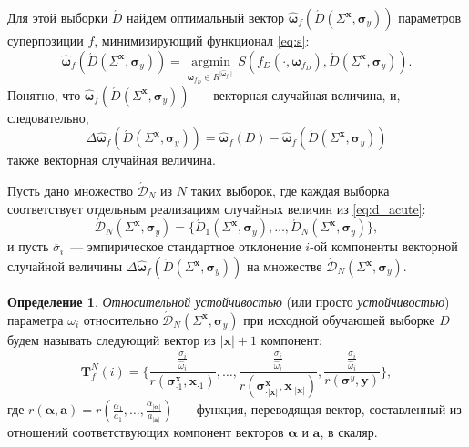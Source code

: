 \documentclass[11pt,a4paper]{article}
\theoremstyle{definition}
\newtheorem{defin}{Определение}
\begin{document}
Для этой выборки $\acute{D}$ найдем оптимальный вектор $\hat{\boldsymbol{\omega}}_f (\acute{D} (\Sigma^{\mathbf{x}}, \boldsymbol{\sigma}_y))$
параметров суперпозиции $f$, минимизирующий функционал \eqref{eq:s}:
\begin{equation}
  \hat{\boldsymbol{\omega}}_f (\acute{D} (\Sigma^{\mathbf{x}}, \boldsymbol{\sigma}_y)) = \mathop{\arg \min}\limits_{\boldsymbol{\omega}_{f_D} \in R^{\mid \hat{\boldsymbol{\omega}}_f \mid}} S (f_D (\cdot, \boldsymbol{\omega}_{f_D}), \acute{D} (\Sigma^{\mathbf{x}}, \boldsymbol{\sigma}_y)).
  \label{eq:hat_omega}
\end{equation}
Понятно, что $\hat{\boldsymbol{\omega}}_f (\acute{D} (\Sigma^{\mathbf{x}}, \boldsymbol{\sigma}_y))$~---
векторная случайная величина, и, следовательно,
\[
  \Delta\hat{\boldsymbol{\omega}}_f(\acute{D} (\Sigma^{\mathbf{x}}, \boldsymbol{\sigma}_y) ) = \hat{\boldsymbol{\omega}}_f(D) - \hat{\boldsymbol{\omega}}_f (\acute{D} (\Sigma^{\mathbf{x}}, \boldsymbol{\sigma}_y))
\]
также векторная случайная величина.

Пусть дано множество $\acute{\mathcal{D}}_N$ из $N$ таких выборок, где каждая выборка
соответствует отдельным реализациям случайных величин из \eqref{eq:d_acute}:
\[
  \acute{\mathcal{D}}_N (\Sigma^{\mathbf{x}}, \boldsymbol{\sigma}_y) = \{ \acute{D}_1 (\Sigma^{\mathbf{x}}, \boldsymbol{\sigma}_y), \dots, \acute{D}_N (\Sigma^{\mathbf{x}}, \boldsymbol{\sigma}_y) \},
\]
и пусть $\overline{\sigma}_i$~--- эмпирическое стандартное отклонение $i$-ой компоненты
векторной случайной величины
$\Delta\hat{\boldsymbol{\omega}}_f(\acute{D} (\Sigma^{\mathbf{x}}, \boldsymbol{\sigma}_y) )$
на множестве $\acute{\mathcal{D}}_N (\Sigma^{\mathbf{x}}, \boldsymbol{\sigma}_y)$.
\begin{defin}
\emph{Относительной устойчивостью} (или просто \emph{устойчивостью}) параметра
$\omega_i$ относительно $\acute{\mathcal{D}}_N (\Sigma^{\mathbf{x}}, \boldsymbol{\sigma}_y)$
при исходной обучающей выборке $D$ будем называть следующий вектор
из $| \mathbf{x} | + 1$ компонент:
\begin{equation}
  \mathbf{T}^N_f(i) = \Big\{ \frac{\frac{\overline{\sigma}_i}{\hat{\omega}_i}}{r(\boldsymbol{\sigma}^\mathbf{x}_{\cdot 1}, \mathbf{x}_{\cdot 1})}, \dots, \frac{\frac{\overline{\sigma}_i}{\hat{\omega}_i}}{r(\boldsymbol{\sigma}^\mathbf{x}_{\cdot |\mathbf{x}|}, \mathbf{x}_{\cdot |\mathbf{x}|})}, \frac{\frac{\overline{\sigma}_i}{\hat{\omega}_i}}{r(\boldsymbol{\sigma}^y, \mathbf{y})} \Big\},
  \label{eq:t_rel}
\end{equation}
где $r(\boldsymbol{\alpha}, \mathbf{a}) = r(\frac{\alpha_1}{a_1}, \dots, \frac{\alpha_{|\boldsymbol{\alpha}|}}{a_{|\mathbf{a}|}})$~---
функция, переводящая вектор, составленный из отношений соответствующих компонент векторов $\boldsymbol{\alpha}$ и $\mathbf{a}$, в скаляр.
\end{defin}
\end{document}
